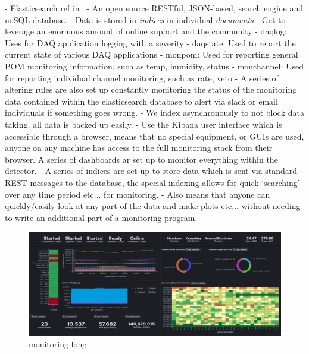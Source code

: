 - Elasticsearch ref in~\cite{elastic2020}
- An open source RESTful, JSON-based, search engine and noSQL database.
- Data is stored in \emph{indices} in individual \emph{documents}
- Get to leverage an enormous amount of online support and the community
- daqlog: Uses for DAQ application logging with a severity
- daqstate: Used to report the current state of various DAQ applications
- monpom: Used for reporting general POM monitoring information, such as temp, humidity, status
- monchannel: Used for reporting individual channel monitoring, such as rate, veto
- A series of altering rules are also set up constantly monitoring the status of the monitoring
data contained within the elasticsearch database to alert via slack or email individuals if something goes wrong.
- We index asynchronously to not block data taking, all data is backed up easily.
- Use the Kibana user interface which is accessible through a browser, means that no special
equipment, or GUIs are used, anyone on any machine has access to the full monitoring stack from
their browser. A series of dashboards ar set up to monitor everything within the detector.
- A series of indices are set up to store data which is sent via standard REST messages to the
database, the special indexing allows for quick `searching' over any time period etc... for
monitoring.
- Also means that anyone can quickly/easily look at any part of the data and make plots etc...
without needing to write an additional part of a monitoring program.

\begin{figure} %
    \includegraphics[width=\textwidth]{diagrams/5-daq/monitoring.pdf}
    \caption[monitoring short]
    {monitoring long}
    \label{fig:monitoring}
\end{figure}